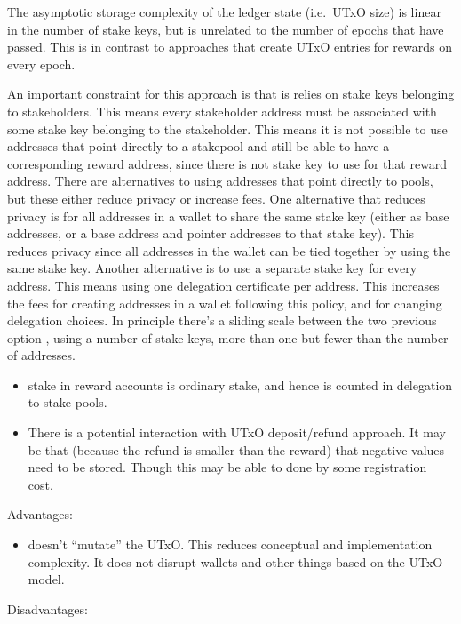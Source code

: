 \documentclass[11pt,a4paper]{article}
\begin{document}
The asymptotic storage complexity of the ledger state (i.e.~UTxO size)
is linear in the number of stake keys, but is unrelated to the number of
epochs that have passed. This is in contrast to approaches that create
UTxO entries for rewards on every epoch.

An important constraint for this approach is that is relies on stake
keys belonging to stakeholders. This means every stakeholder address
must be associated with some stake key belonging to the stakeholder.
This means it is not possible to use addresses that point directly to a
stakepool and still be able to have a corresponding reward address,
since there is not stake key to use for that reward address. There are
alternatives to using addresses that point directly to pools, but these
either reduce privacy or increase fees. One alternative that reduces
privacy is for all addresses in a wallet to share the same stake key
(either as base addresses, or a base address and pointer addresses to
that stake key). This reduces privacy since all addresses in the wallet
can be tied together by using the same stake key. Another alternative is
to use a separate stake key for every address. This means using one
delegation certificate per address. This increases the fees for creating
addresses in a wallet following this policy, and for changing delegation
choices. In principle there's a sliding scale between the two previous
option , using a number of stake keys, more than one but fewer than the
number of addresses.

\begin{itemize}
\item
  stake in reward accounts is ordinary stake, and hence is counted in
  delegation to stake pools.
\item
  There is a potential interaction with UTxO deposit/refund approach. It
  may be that (because the refund is smaller than the reward) that
  negative values need to be stored. Though this may be able to done by
  some registration cost.
\end{itemize}

Advantages:

\begin{itemize}
\item
  doesn't ``mutate'' the UTxO. This reduces conceptual and
  implementation complexity. It does not disrupt wallets and other
  things based on the UTxO model.
\end{itemize}

Disadvantages:
\end{document}
